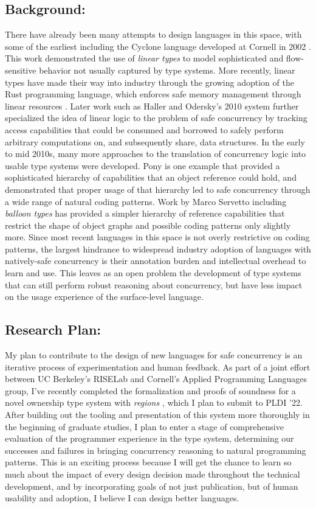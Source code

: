 \documentclass{nsf-grfp}
\begin{document}
\subsection*{Background:} There have already been many attempts to design languages in this space, with some of the earliest including the Cyclone language developed at Cornell in 2002 \cite{cyclone}. This work demonstrated the use of \textit{linear types} to model sophisticated and flow-sensitive behavior not usually captured by type systems. More recently, linear types have made their way into industry through the growing adoption of the Rust programming language, which enforces safe memory management through linear resources \cite{rust}. Later work such as Haller and Odersky's 2010 system \cite{haller odersky} further specialized the idea of linear logic to the problem of safe concurrency by tracking access capabilities that could be consumed and borrowed to safely perform arbitrary computations on, and subsequently share, data structures. In the early to mid 2010s, many more approaches to the translation of concurrency logic into usable type systems were developed. Pony \cite{pony} is one example that provided a sophisticated hierarchy of capabilities that an object reference could hold, and demonstrated that proper usage of that hierarchy led to safe concurrency through a wide range of natural coding patterns. Work by Marco Servetto including \textit{balloon types} \cite{balloon types} has provided a simpler hierarchy of reference capabilities that restrict the shape of object graphs and possible coding patterns only slightly more. Since most recent languages in this space is not overly restrictive on coding patterns, the largest hindrance to widespread industry adoption of languages with natively-safe concurrency is their annotation burden and intellectual overhead to learn and use. This leaves as an open problem the development of type systems that can still perform robust reasoning about concurrency, but have less impact on the usage experience of the surface-level language.

\subsection*{Research Plan:} My plan to contribute to the design of new languages for safe concurrency is an iterative process of experimentation and human feedback. As part of a joint effort between UC Berkeley's RISELab and Cornell's Applied Programming Languages group, I've recently completed the formalization and proofs of soundness for a novel ownership type system with \textit{regions} \cite{regions}, which I plan to submit to PLDI '22. After building out the tooling and presentation of this system more thoroughly in the beginning of graduate studies, I plan to enter a stage of comprehensive evaluation of the programmer experience in the type system, determining our successes and failures in bringing concurrency reasoning to natural programming patterns. This is an exciting process because I will get the chance to learn so much about the impact of every design decision made throughout the technical development, and by incorporating goals of not just publication, but of human usability and adoption, I believe I can design better languages. 
\end{document}
